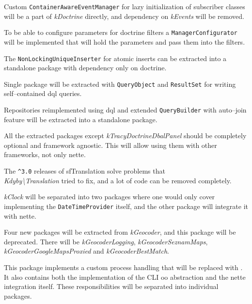 Custom \lstinline{ContainerAwareEventManager} for lazy initialization of subscriber classes will be a part of \textit{\gls{kDoctrine}} directly, and dependency on \textit{\gls{kEvents}} will be removed.

To be able to configure parameters for \gls{doctrine} filters a \lstinline{ManagerConfigurator} will be implemented that will hold the parameters and pass them into the filters.

The \lstinline{NonLockingUniqueInserter} for atomic inserts can be extracted into a standalone package with dependency only on \gls{doctrine}.

Single package will be extracted with \lstinline{QueryObject} and \lstinline{ResultSet} for writing self--contained \gls{dql} queries.

Repositories reimplemented using \gls{dql} and extended \lstinline{QueryBuilder} with auto--join feature will be extracted into a standalone package.

All the extracted packages except \textit{\gls{kTracyDoctrineDbalPanel}} should be completely optional and framework agnostic. This will allow using them with other frameworks, not only \gls{nette}.


The \lstinline{^3.0} releases of \gls{sfTranslation} solve problems that \\\textit{Kdyby\textbackslash{}Translation} tried to fix, and a lot of code can be removed completely.


\textit{\gls{kClock}} will be separated into two packages where one would only cover implementing the \lstinline{DateTimeProvider} itself, and the other package will integrate it with \gls{nette}.


Four new packages will be extracted from \textit{\gls{kGeocoder}}, and this package will be deprecated. There will be \textit{\gls{kGeocoderLogging}}, \textit{\gls{kGeocoderSeznamMaps}}, \textit{\gls{kGeocoderGoogleMapsProxied}} and \textit{\gls{kGeocoderBestMatch}}.


This package implements a custom process handling that will be replaced with . It also contains both the implementation of the CLI \gls{oo} abstraction and the \gls{nette} integration itself. These responsibilities will be separated into individual packages.
